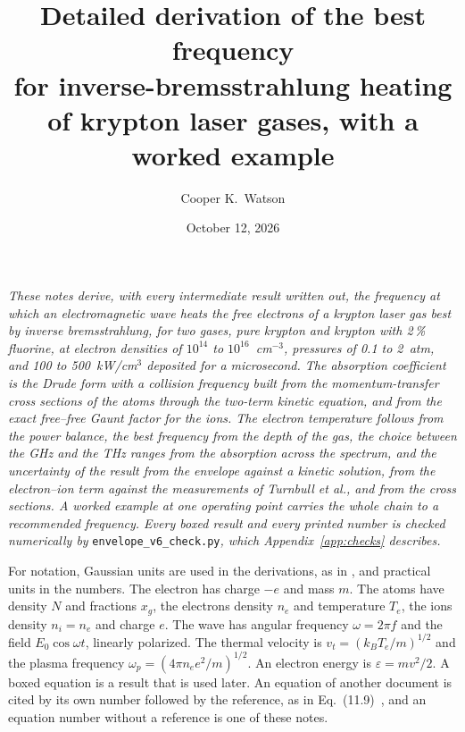 \documentclass[11pt]{article}
\title{Detailed derivation of the best frequency\\ for inverse-bremsstrahlung heating\\
of krypton laser gases, with a worked example}
\author{Cooper K.\ Watson}
\date{October 12, 2026}
\numberwithin{equation}{section}
\newcommand{\vt}{v_t}
\newcommand{\kB}{k_B}
\newcommand{\Te}{T_e}
\begin{document}
\maketitle

\noindent\emph{These notes derive, with every intermediate result written out, the
frequency at which an electromagnetic wave heats the free electrons of a krypton laser
gas best by inverse bremsstrahlung, for two gases, pure krypton and krypton with 2\,\%
fluorine, at electron densities of $10^{14}$ to $10^{16}$~cm$^{-3}$, pressures of 0.1 to
2~atm, and 100 to 500~kW/cm$^3$ deposited for a microsecond. The absorption coefficient
is the Drude form with a collision frequency built from the momentum-transfer cross
sections of the atoms through the two-term kinetic equation, and from the exact
free--free Gaunt factor for the ions. The electron temperature follows from the power
balance, the best frequency from the depth of the gas, the choice between the GHz and the
THz ranges from the absorption across the spectrum, and the uncertainty of the result
from the envelope against a kinetic solution, from the electron--ion term against the
measurements of Turnbull et al., and from the cross sections. A worked example at one
operating point carries the whole chain to a recommended frequency. Every boxed result and
every printed number is checked numerically by} \texttt{envelope\_v6\_check.py}\emph{,
which Appendix~\ref{app:checks} describes.}

\medskip
\noindent For notation, Gaussian units are used in the derivations, as in
\cite{Atzeni2004}, and practical units in the numbers. The electron has charge $-e$ and
mass $m$. The atoms have density $N$ and fractions $x_g$, the electrons density $n_e$ and
temperature $\Te$, the ions density $n_i=n_e$ and charge $e$. The wave has angular
frequency $\omega=2\pi f$ and the field $E_0\cos\omega t$, linearly polarized. The
thermal velocity is $\vt=(\kB\Te/m)^{1/2}$ and the plasma frequency
$\omega_p=(4\pi n_ee^2/m)^{1/2}$. An electron energy is $\varepsilon=mv^2/2$. A boxed
equation is a result that is used later. An equation of another document is cited by
its own number followed by the reference, as in Eq.~(11.9)~\cite{Atzeni2004}, and an
equation number without a reference is one of these notes.

\tableofcontents


\end{document}
